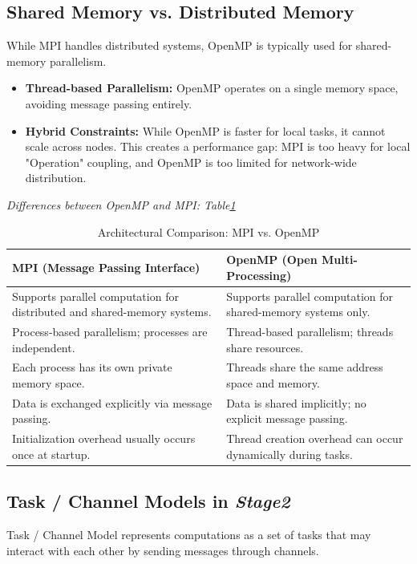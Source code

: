 \documentclass[
	a4paper,
	10pt,
	unnumberedsections,
	twoside, 
]{LTJournalArticle}
\begin{document}
\subsection{Shared Memory vs. Distributed Memory}
\label{sec:OMPvsMPI}
While MPI handles distributed systems, OpenMP is typically used for shared-memory parallelism.
\begin{itemize}
\item \textbf{Thread-based Parallelism:} OpenMP operates on a single memory space, avoiding message passing entirely.
\item \textbf{Hybrid Constraints:} While OpenMP is faster for local tasks, it cannot scale across nodes. This creates a performance gap: MPI is too heavy for local "Operation" coupling, and OpenMP is too limited for network-wide distribution.
\end{itemize}
\textit{Differences between OpenMP and MPI: Table\ref{tab:mpi_vs_openmp}} 


\begin{table}[ht] %
	\centering
	\small %
	\begin{tabularx}{\textwidth}{|X|X|} %
		\hline
		\rowcolor{gray!10} %
		\textbf{MPI (Message Passing Interface)} & \textbf{OpenMP (Open Multi-Processing)} \\ \hline
		Supports parallel computation for distributed and shared-memory systems. & Supports parallel computation for shared-memory systems only. \\ \hline
		Process-based parallelism; processes are independent. & Thread-based parallelism; threads share resources. \\ \hline
		Each process has its own private memory space. & Threads share the same address space and memory. \\ \hline
		Data is exchanged explicitly via message passing. & Data is shared implicitly; no explicit message passing. \\ \hline
		Initialization overhead usually occurs once at startup. & Thread creation overhead can occur dynamically during tasks. \\ \hline
	\end{tabularx}
	\caption{Architectural Comparison: MPI vs. OpenMP}
	\label{tab:mpi_vs_openmp}
\end{table}

\subsection{Task / Channel Models in \textit{Stage2}}
Task / Channel Model represents computations as a set of tasks that may interact with each other by sending messages through channels. 
\end{document}
